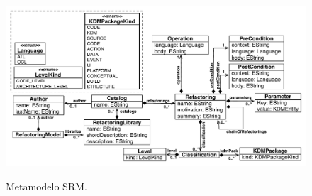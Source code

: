 \begin{figure}[h]
	\centering
		\caption{Metamodelo SRM.}
	\includegraphics[scale=0.65]{images/refactoring_metamodel}
	\label{fig:meta_modelo_SRM}
	\fautor
\end{figure}

